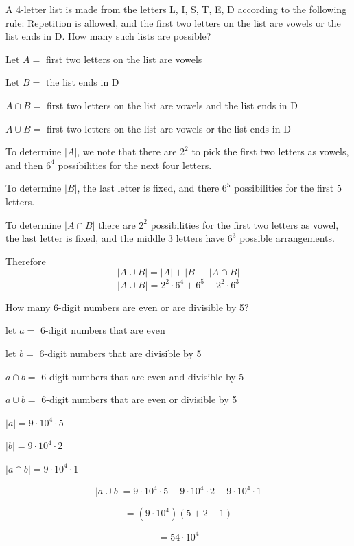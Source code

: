 \documentclass[openany, 12pt]{book}
\begin{document}
\begin{exercise}{}{}
	A 4-letter list is made from the letters L, I, S, T, E, D
	according to the following rule: Repetition is allowed, and the first two
	letters on the list are vowels or the list ends in D. How many such lists are
	possible?
	\begin{alist}
		\item Let $A=$ first two letters on the list are vowels
		\item Let $B=$ the list ends in D
		\item $A\cap B=$ first two letters on the list are vowels and the list ends in D
		\item $A\cup B=$ first two letters on the list are vowels or the list ends in D
		\item To determine $|A|$, we note that there are $2^2$ to pick the first two
		letters as vowels, and then $6^4$ possibilities for the next four letters.
		\item To determine $|B|$, the last letter is fixed, and there $6^5$
		possibilities for the first 5 letters.
		\item To determine $|A\cap B|$ there are $2^2$ possibilities for the first two
		letters as vowel, the last letter is fixed, and the middle 3 letters have
		$6^3$ possible arrangements.
		\item Therefore
		$$|A \cup B | = |A| + |B| - |A \cap B|$$
		$$|A \cup B | = 2^2\cdot6^4 + 6^5 - 2^2\cdot6^3$$
	\end{alist}
\end{exercise}

\begin{exercise}{}{}
	How many 6-digit numbers are even or are divisible by 5?
	\begin{alist}
		\item let $a=$ 6-digit numbers that are even
		\item let $b=$ 6-digit numbers that are divisible by 5
		\item $a\cap b=$ 6-digit numbers that are even and divisible by 5
		\item $a\cup b=$ 6-digit numbers that are even or divisible by 5
		\item $|a|=9\cdot10^4\cdot5$
		\item $|b|=9\cdot10^4\cdot2$
		\item $|a\cap b|= 9\cdot10^4\cdot1$
		\item $$|a\cup b|= 9\cdot10^4\cdot5 + 9\cdot10^4\cdot2 - 9\cdot10^4\cdot1$$
		\item $$= (9\cdot10^4)(5 + 2 -1)$$
		\item $$= 54\cdot10^4$$
	\end{alist}
\end{exercise}
\end{document}
